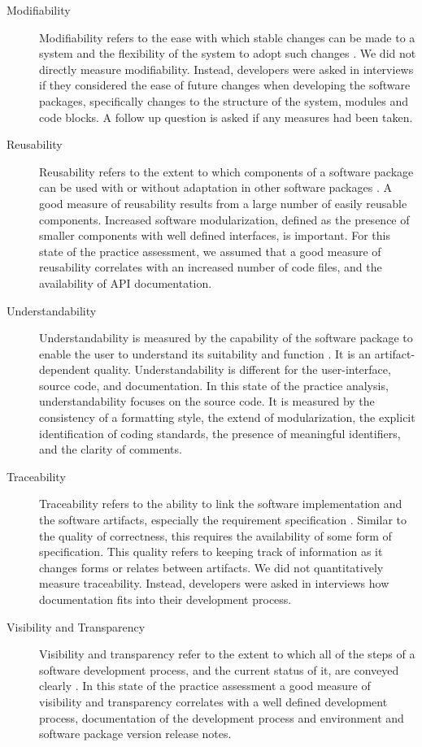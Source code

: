 \documentclass[final, 3p, times, authoryear]{elsarticle}
\begin{document}
\begin{description}
	\item[Modifiability] Modifiability refers to the ease with which stable
	changes can be made to a system and the flexibility of the system to adopt
	such changes \citep{8016712}. We did not directly measure modifiability.
	Instead, developers were asked in interviews if they considered the ease of
	future changes when developing the software packages, specifically changes
	to the structure of the system, modules and code blocks. A follow up
	question is asked if any measures had been taken.
	
	\item[Reusability] Reusability refers to the extent to which components of a
	software package can be used with or without adaptation in other software
	packages \citep{kalagiakos2003non}. A good measure of reusability results
	from a large number of easily reusable components. Increased software
	modularization, defined as the presence of smaller components with well
	defined interfaces, is important. For this state of the practice assessment,
	we assumed that a good measure of reusability correlates with an increased
	number of code files, and the availability of API documentation.
	
	\item[Understandability] Understandability is measured by the capability of
	the software package to enable the user to understand its suitability and
	function \citep{ISO9126}. It is an artifact-dependent quality.
	Understandability is different for the user-interface, source code, and
	documentation. In this state of the practice analysis, understandability
	focuses on the source code. It is measured by the consistency of a
	formatting style, the extend of modularization, the explicit identification
	of coding standards, the presence of meaningful identifiers, and the clarity
	of comments. 
	
	\item[Traceability] Traceability refers to the ability to link the software
	implementation and the software artifacts, especially the requirement
	specification \citep{McCallEtAl1977}. Similar to the quality of correctness,
	this requires the availability of some form of specification. This quality
	refers to keeping track of information as it changes forms or relates
	between artifacts. We did not quantitatively measure traceability. Instead,
	developers were asked in interviews how documentation fits into their
	development process.
	
	\item[Visibility and Transparency] Visibility and transparency refer to the
	extent to which all of the steps of a software development process, and the
	current status of it, are conveyed clearly \citep{ghezzi1991fundamentals}.
	In this state of the practice assessment a good measure of visibility and
	transparency correlates with a well defined development process,
	documentation of the development process and environment and software
	package version release notes.
	

\end{description}
\end{document}

